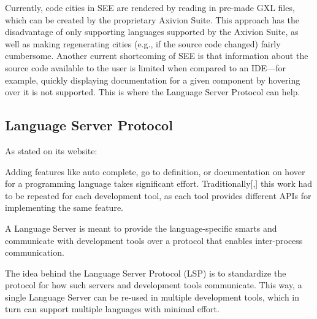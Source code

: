 \documentclass{scrartcl}
\newcommand{\SEE}{\textsc{SEE}}
\begin{document}
Currently, code cities in \SEE{} are rendered by reading in pre-made GXL files, which can be created by the proprietary Axivion Suite.
This approach has the disadvantage of only supporting languages supported by the Axivion Suite, as well as making regenerating cities (e.g., if the source code changed) fairly cumbersome.
Another current shortcoming of \SEE{} is that information about the source code available to the user is limited when compared to an IDE---for example, quickly displaying documentation for a given component by hovering over it is not supported.
This is where the Language Server Protocol can help.

\subsection{Language Server Protocol}

As stated on its website:
\begin{displayquote}
	Adding features like auto complete, go to definition, or documentation on hover for a programming language takes significant effort. Traditionally[,] this work had to be repeated for each development tool, as each tool provides different APIs for implementing the same feature.

	A Language Server is meant to provide the language-specific smarts and communicate with development tools over a protocol that enables inter-process communication.

	The idea behind the Language Server Protocol (LSP) is to standardize the protocol for how such servers and development tools communicate. This way, a single Language Server can be re-used in multiple development tools, which in turn can support multiple languages with minimal effort.
\end{displayquote}
\end{document}
